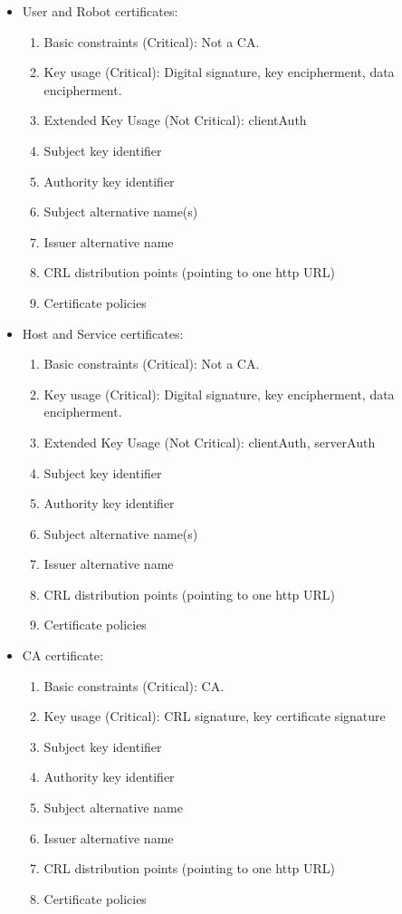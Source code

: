 \begin{itemize}
\item{User and Robot certificates:}
\begin{enumerate}
\item{Basic constraints (Critical): Not a CA.}
\item{Key usage (Critical): Digital signature, key encipherment, data encipherment.}
\item{Extended Key Usage (Not Critical): clientAuth}
\item{Subject key identifier}
\item{Authority key identifier}
\item{Subject alternative name(s)}
\item{Issuer alternative name}
\item{CRL distribution points (pointing to one http URL)}
\item{Certificate policies}
\end{enumerate}

\item{Host and Service certificates:}
\begin{enumerate}
\item{Basic constraints (Critical): Not a CA.}
\item{Key usage (Critical): Digital signature, key encipherment, data encipherment.}
\item{Extended Key Usage (Not Critical): clientAuth, serverAuth}
\item{Subject key identifier}
\item{Authority key identifier}
\item{Subject alternative name(s)}
\item{Issuer alternative name}
\item{CRL distribution points (pointing to one http URL)}
\item{Certificate policies}
\end{enumerate}

\item{CA certificate:}
\begin{enumerate}
\item{Basic constraints (Critical): CA.}
\item{Key usage (Critical): CRL signature, key certificate signature}
\item{Subject key identifier}
\item{Authority key identifier}
\item{Subject alternative name}
\item{Issuer alternative name}
\item{CRL distribution points (pointing to one http URL)}
\item{Certificate policies}
\end{enumerate}
\end{itemize}

